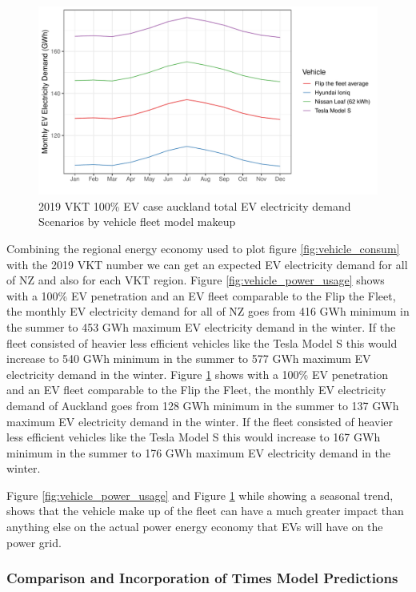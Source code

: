 \documentclass[
]{article}
\begin{document}
\begin{figure}
\centering
\includegraphics{final_report_files/figure-latex/vehicle_power_usage_auck-1.pdf}
\caption{2019 VKT 100\% EV case auckland total EV electricity demand
Scenarios by vehicle fleet model
makeup\label{fig:vehicle_power_usage_auck}}
\end{figure}

Combining the regional energy economy used to plot figure
\ref{fig:vehicle_consum} with the 2019 VKT number we can get an expected
EV electricity demand for all of NZ and also for each VKT region. Figure
\ref{fig:vehicle_power_usage} shows with a 100\% EV penetration and an
EV fleet comparable to the Flip the Fleet, the monthly EV electricity
demand for all of NZ goes from 416 GWh minimum in the summer to 453 GWh
maximum EV electricity demand in the winter. If the fleet consisted of
heavier less efficient vehicles like the Tesla Model S this would
increase to 540 GWh minimum in the summer to 577 GWh maximum EV
electricity demand in the winter. Figure
\ref{fig:vehicle_power_usage_auck} shows with a 100\% EV penetration and
an EV fleet comparable to the Flip the Fleet, the monthly EV electricity
demand of Auckland goes from 128 GWh minimum in the summer to 137 GWh
maximum EV electricity demand in the winter. If the fleet consisted of
heavier less efficient vehicles like the Tesla Model S this would
increase to 167 GWh minimum in the summer to 176 GWh maximum EV
electricity demand in the winter.

Figure \ref{fig:vehicle_power_usage} and Figure
\ref{fig:vehicle_power_usage_auck} while showing a seasonal trend, shows
that the vehicle make up of the fleet can have a much greater impact
than anything else on the actual power energy economy that EVs will have
on the power grid.

\hypertarget{comparison-and-incorporation-of-times-model-predictions}{%
\subsubsection{Comparison and Incorporation of Times Model
Predictions}\label{comparison-and-incorporation-of-times-model-predictions}}
\end{document}
